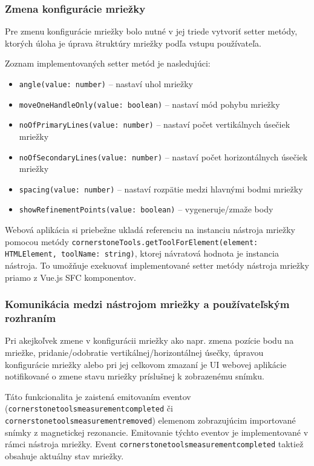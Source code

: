 \subsubsection {Zmena konfigurácie mriežky}
Pre zmenu konfigurácie mriežky bolo nutné v jej triede vytvoriť setter metódy, ktorých úloha je úprava štruktúry mriežky podľa vstupu používateľa.

Zoznam implementovaných setter metód je nasledujúci:
\begin {itemize}
\item {\texttt{angle(value: number)} -- nastaví uhol mriežky}
\item {\texttt{moveOneHandleOnly(value: boolean)} -- nastaví mód pohybu mriežky}
\item {\texttt{noOfPrimaryLines(value: number)} -- nastaví počet vertikálnych úsečiek mriežky}
\item {\texttt{noOfSecondaryLines(value: number)} -- nastaví počet horizontálnych úsečiek mriežky}
\item {\texttt{spacing(value: number)} -- nastaví rozpätie medzi hlavnými bodmi mriežky}
\item {\texttt{showRefinementPoints(value: boolean)} -- vygeneruje/zmaže  body}
\end {itemize}

Webová aplikácia si priebežne ukladá referenciu na instanciu nástroja mriežky pomocou metódy \texttt{cornerstoneTools.getToolForElement(element: HTMLElement, toolName: string)}, ktorej návratová hodnota je instancia nástroja. To umožňuje exekuovať implementované setter metódy nástroja mriežky priamo z Vue.js SFC komponentov.

\subsubsection {Komunikácia medzi nástrojom mriežky a používateľským rozhraním}
Pri akejkoľvek zmene v konfigurácii mriežky ako napr. zmena pozície bodu na mriežke, pridanie/odobratie vertikálnej/horizontálnej úsečky, úpravou konfigurácie mriežky alebo pri jej celkovom zmazaní je UI webovej aplikácie notifikované o zmene stavu mriežky príslušnej k zobrazenému snímku.

Táto funkcionalita je zaistená emitovaním eventov (\texttt{cornerstonetoolsmeasurementcompleted} či \texttt{cornerstonetoolsmeasurementremoved}) elemenom zobrazujúcim importované snímky z magnetickej rezonancie. Emitovanie týchto eventov je implementované v rámci nástroja mriežky.
Event \texttt{cornerstonetoolsmeasurementcompleted} taktiež obsahuje aktuálny stav mriežky.

